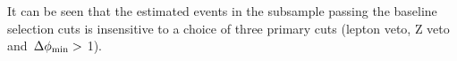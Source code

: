 It can be seen that the estimated \wjets events in the subsample passing the baseline selection cuts is insensitive to a choice of three primary cuts 
(lepton veto, Z veto and $\,{\Delta\phi_{\rm min}}>$ 1).
